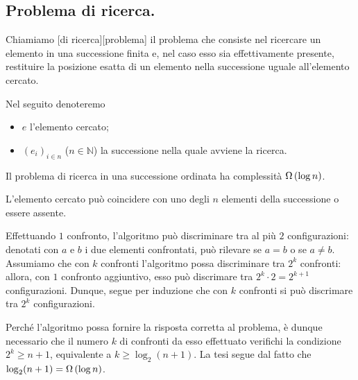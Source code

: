 \subsection{Problema di ricerca.}
\label{AlgoritmiEStruttureDiDati_ProblemaDiRicerca}
\begin{Definition}
	Chiamiamo [di ricerca][problema] il problema che
  consiste nel ricercare un elemento in una successione finita e, nel caso esso
  sia effettivamente presente, restituire la posizione esatta di un elemento
  nella successione uguale all'elemento cercato.
\end{Definition}
\par Nel seguito denoteremo
\begin{itemize}
  \item $e$ l'elemento cercato;
  \item $(e_i)_{i \in n}$ ($n \in \mathbb{N}$) la
    successione nella quale avviene la ricerca.
\end{itemize}
\begin{Theorem}
	Il problema di ricerca in una successione ordinata ha complessit\`a
  $\Omega \left ( \log n \right )$.
\end{Theorem}
\Proof L'elemento cercato pu\`o coincidere con uno degli $n$ elementi della
successione o essere assente.
\par Effettuando $1$ confronto, l'algoritmo pu\`o discriminare tra al pi\`u $2$
configurazioni: denotati con $a$ e $b$ i due elementi confrontati, pu\`o
rilevare se $a = b$ o se $a \neq b$. Assumiamo che con $k$
confronti l'algoritmo possa discriminare tra $2^k$ confronti: allora, con $1$
confronto aggiuntivo, esso pu\`o discrimare tra $2^k \cdot 2 = 2^{k + 1}$
configurazioni. Dunque, segue per induzione che con $k$ confronti si pu\`o
discrimare tra $2^k$ configurazioni.
\par Perch\'e l'algoritmo possa fornire la risposta corretta al problema, \`e
dunque necessario che il numero $k$ di confronti da esso effettuato verifichi la
condizione $2^k \geq n + 1$, equivalente a $k \geq \log_2 (n + 1)$. La tesi
segue dal fatto che $\log_2 (n + 1) = \Omega \left ( \log n \right )$. \EndProof
